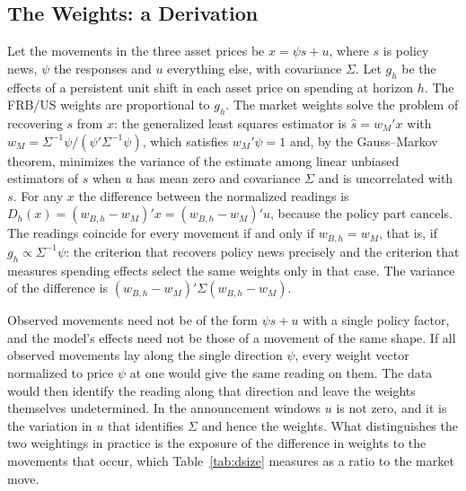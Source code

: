 \documentclass[11pt]{article}
\begin{document}



\FloatBarrier
\newpage
\begin{appendices}
\renewcommand{\thetable}{\Alph{section}\arabic{table}}
\renewcommand{\thefigure}{\Alph{section}\arabic{figure}}
\FloatBarrier

\section{The Weights: a Derivation}\label{app:ma}
Let the movements in the three asset prices be $x=\psi s+u$, where $s$ is policy news, $\psi$ the responses and $u$ everything else, with covariance $\Sigma$. Let $g_h$ be the effects of a persistent unit shift in each asset price on spending at horizon $h$. The FRB/US weights are proportional to $g_h$. The market weights solve the problem of recovering $s$ from $x$: the generalized least squares estimator is $\hat s=w_M'x$ with $w_M=\Sigma^{-1}\psi/(\psi'\Sigma^{-1}\psi)$, which satisfies $w_M'\psi=1$ and, by the Gauss--Markov theorem, minimizes the variance of the estimate among linear unbiased estimators of $s$ when $u$ has mean zero and covariance $\Sigma$ and is uncorrelated with $s$. For any $x$ the difference between the normalized readings is $D_h(x)=(w_{B,h}-w_M)'x=(w_{B,h}-w_M)'u$, because the policy part cancels. The readings coincide for every movement if and only if $w_{B,h}=w_M$, that is, if $g_h\propto\Sigma^{-1}\psi$: the criterion that recovers policy news precisely and the criterion that measures spending effects select the same weights only in that case. The variance of the difference is $(w_{B,h}-w_M)'\Sigma(w_{B,h}-w_M)$.

Observed movements need not be of the form $\psi s+u$ with a single policy factor, and the model's effects need not be those of a movement of the same shape. If all observed movements lay along the single direction $\psi$, every weight vector normalized to price $\psi$ at one would give the same reading on them. The data would then identify the reading along that direction and leave the weights themselves undetermined. In the announcement windows $u$ is not zero, and it is the variation in $u$ that identifies $\Sigma$ and hence the weights. What distinguishes the two weightings in practice is the exposure of the difference in weights to the movements that occur, which Table~\ref{tab:dsize} measures as a ratio to the market move.




\end{appendices}
\end{document}
